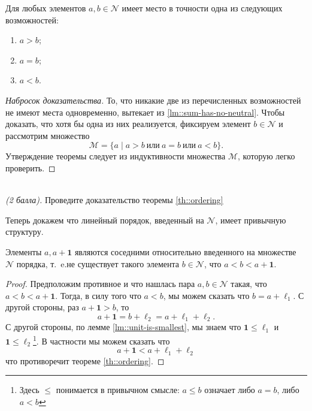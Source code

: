 \documentclass{article}
\newcommand{\ie}{т{.}~e{.}}
\begin{document}
\begin{theorem}
    \label{th::ordering}
    Для любых элементов \( a, b \in \mathcal{N} \) имеет место в точности одна из следующих возможностей:
    \begin{enumerate}[noitemsep, topsep=0pt, parsep=0pt]
        \item \( a > b \);
        \item \( a = b \);
        \item \( a < b \).
    \end{enumerate}    
\end{theorem}
\begin{proof}[Набросок доказательства]
    То, что никакие две из перечисленных возможностей не имеют места одновременно, вытекает из \ref{lm::sum-has-no-neutral}. Чтобы доказать, что хотя бы одна из них реализуется, фиксируем элемент \( b \in \mathcal{N} \) и рассмотрим множество
    \[
        \mathcal{M} = \{a \mid a > b \  \text{или} \  a = b \  \text{или} \  a < b\}.
    \]    
    Утверждение теоремы следует из индуктивности множества \( \mathcal{M}\), которую легко проверить.   
\end{proof}
\begin{?}\ \\    
    \textit{(2 балла).} Проведите доказательство теоремы \ref{th::ordering}
\end{?}

Теперь докажем что линейный порядок, введенный на \(\mathcal{N}\), имеет привычную структуру.
\begin{corollary}
    \label{cor::ordering}
    Элементы \( a, a + \mathbf{1} \) являются соседними относительно введенного на множестве \( \mathcal{N} \) порядка, \ie не существует такого элемента \( b \in \mathcal{N} \), что \( a < b < a + \mathbf{1} \).    
\end{corollary}
\begin{proof}
    Предположим противное и что нашлась пара \(a, b \in \mathcal{N}\) такая, что \( a < b < a + \mathbf{1} \). Тогда, в силу того что \(a < b\), мы можем сказать что \(b = a + \ell_1\). С другой стороны, раз \(a + \mathbf{1} > b\), то 
    \[
        a + \mathbf{1} = b + \ell_2 = a + \ell_1 + \ell_2.
    \]
    С другой стороны, по лемме \ref{lm::unit-is-smallest}, мы знаем что \(\mathbf{1} \leq \ell_1\) и \(\mathbf{1} \leq \ell_2\)\footnote{Здесь \(\leq\) понимается в привычном смысле: \(a \leq b\) означает либо \(a = b\), либо \(a < b\)}. В частности мы можем сказать что 
    \[
        a + \mathbf{1} <  a + \ell_1 + \ell_2
    \]
    что противоречит теореме \ref{th::ordering}.
\end{proof}
\end{document}
